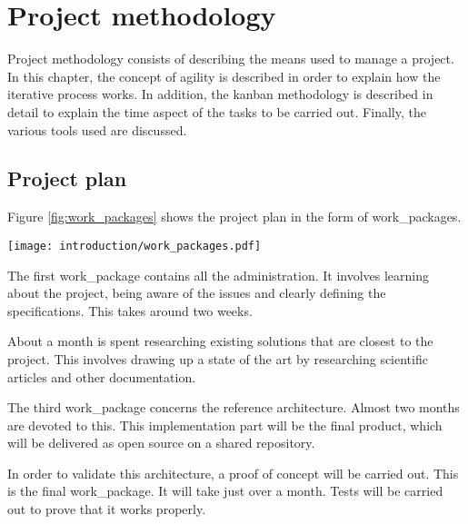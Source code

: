 

\chapter{Project methodology}
\label{chap:methodology}

Project methodology consists of describing the means used to manage a project. In this chapter, the concept of agility is described in order to explain how the iterative process works. In addition, the \gls{kanban} methodology is described in detail to explain the time aspect of the tasks to be carried out. Finally, the various tools used are discussed.

\minitoc
\newpage

\section{Project plan}

Figure \ref{fig:work_packages} shows the project plan in the form of \glspl{work_package}.
\begin{center}
    \begingroup
    \texttt{[image: introduction/work\_packages.pdf]}
    \label{fig:work_packages}
    \endgroup
\end{center}
The first \gls{work_package} contains all the administration. It involves learning about the project, being aware of the issues and clearly defining the specifications. This takes around two weeks.

About a month is spent researching existing solutions that are closest to the project. This involves drawing up a state of the art by researching scientific articles and other documentation.

The third \gls{work_package} concerns the reference architecture. Almost two months are devoted to this. This implementation part will be the final product, which will be delivered as open source on a shared repository.

In order to validate this architecture, a proof of concept will be carried out. This is the final \gls{work_package}. It will take just over a month. Tests will be carried out to prove that it works properly.


